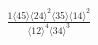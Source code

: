 \documentclass[varwidth, border=5pt]{standalone}
\begin{document}
\begin{my}
$\begin{gathered}
\scriptscriptstyle\frac{1⟨45⟩⟨24⟩^2⟨35⟩⟨14⟩^2}{⟨12⟩^4⟨34⟩^3}
\end{gathered}$
\end{my}
\end{document}
